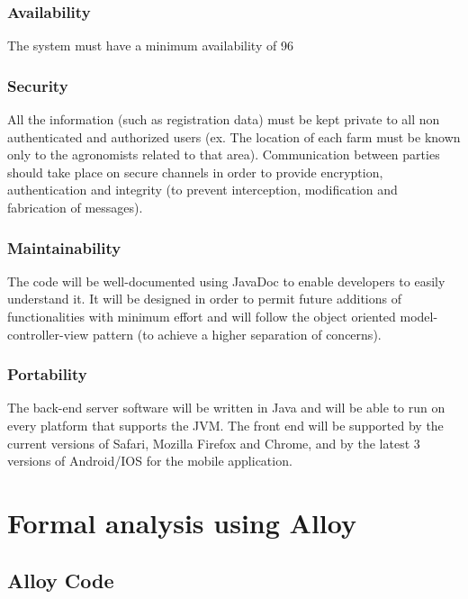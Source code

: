 \documentclass{article}
\begin{document}
\subsubsection{Availability}
The system must have a minimum availability of 96%

\subsubsection{Security}
All the information (such as registration data) must be kept private to all non authenticated and authorized users (ex. The location of each farm must be known only to the agronomists related to that area). 
Communication between parties should take place on secure channels in order to provide encryption, authentication and integrity (to prevent interception, modification and fabrication of messages).

\subsubsection{Maintainability}
The code will be well-documented using JavaDoc to enable developers to easily understand it. It will be designed in order to permit future additions of functionalities with minimum effort and will follow the object oriented model-controller-view pattern (to achieve a higher separation of concerns).

\subsubsection{Portability}
The back-end server software will be written in Java and will be able to run on every
platform that supports the JVM. The front end will be supported by the current versions of Safari, Mozilla Firefox and Chrome, and by the latest 3 versions of Android/IOS for the mobile application.




\newpage





\section{Formal analysis using Alloy} 

\subsection{Alloy Code}
\end{document}
